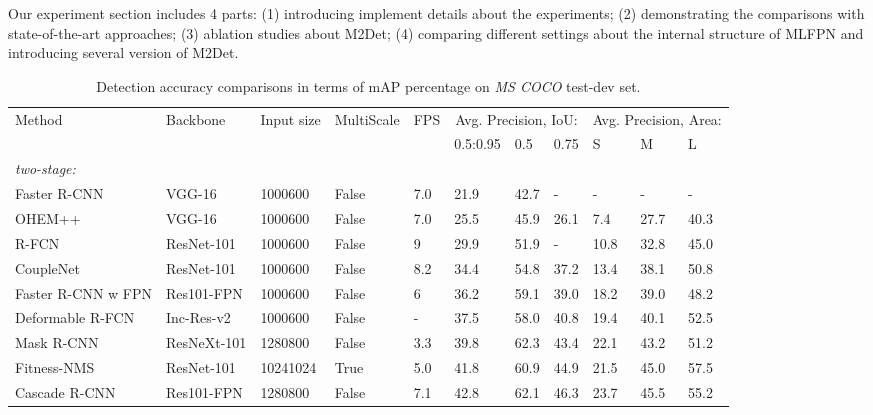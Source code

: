 \documentclass[letterpaper]{article} \usepackage{aaai18}  \usepackage{times}  \usepackage{helvet}  \usepackage{courier}  \usepackage{url}  \usepackage{graphicx}
\begin{document}
Our experiment section includes 4 parts: (1) introducing implement details about the experiments; (2) demonstrating the comparisons with state-of-the-art approaches; (3) ablation studies about M2Det; (4) comparing different settings about the internal structure of MLFPN and introducing several version of M2Det.

\begin{table*}[!t]
\centering
 \scriptsize
	\caption{Detection accuracy comparisons in terms of mAP percentage on \textit{MS COCO} test-dev set.}
	\label{tab:cocoresults}
	\centering
	\begin{tabular}{|p{5cm}<{\raggedright}|p{1.4cm}<{\raggedright}|p{1.3cm}<{\centering}|p{1.0cm}<{\centering}|p{0.8cm}<{\centering}|p{0.6cm}<{\centering}p{0.6cm}<{\centering}p{0.6cm}<{\centering}|p{0.6cm}<{\centering}p{0.6cm}<{\centering}p{0.6cm}<{\centering}|}
		\hline
\multirow{2}{*}{Method} & \multirow{2}{*}{Backbone} & \multirow{2}{*}{Input size} &  \multirow{2}{*}{MultiScale} & \multirow{2}{*}{FPS} &\multicolumn{3}{c|}{Avg. Precision, IoU:} & \multicolumn{3}{c|}{Avg. Precision, Area:}  \\
		& & & & & 0.5:0.95 & 0.5 & 0.75 & S & M & L \\
		\hline
		\small\textit{two-stage:} & & & & & & & & & &\quad \\
		Faster R-CNN \cite{RenHGS15}   & VGG-16 & 1000600&False&7.0& 21.9 & 42.7 & - & - & - & - \\
		OHEM++ \cite{ShrivastavaGG16}  & VGG-16 & 1000600&False&7.0& 25.5 & 45.9 & 26.1 & 7.4 & 27.7 & 40.3 \\
		R-FCN \cite{DaiLHS16} & ResNet-101 & 1000600&False&9& 29.9 & 51.9 & - & 10.8 & 32.8 & 45.0 \\
		CoupleNet \cite{ZhuZWZWL17}  & ResNet-101 & 1000600&False&8.2& 34.4 & 54.8 & 37.2 & 13.4 & 38.1 & 50.8 \\
Faster R-CNN w FPN \cite{LinDGHHB17}  & Res101-FPN & 1000600&False&6& 36.2 & 59.1 & 39.0 & 18.2 & 39.0 & 48.2 \\
		Deformable R-FCN \cite{DaiQXLZHW17}  & Inc-Res-v2 & 1000600&False&-& 37.5 & 58.0 & 40.8 & 19.4 & 40.1 & 52.5 \\
		Mask R-CNN \cite{HeGDG17} &ResNeXt-101 &1280800 & False &3.3& 39.8 & 62.3 & 43.4 & 22.1 & 43.2& 51.2\\
		Fitness-NMS \cite{abs-1711-00164} &ResNet-101 & 10241024 &True & 5.0 & 41.8&60.9 &44.9& 21.5&45.0&57.5\\
		Cascade R-CNN \cite{abs-1712-00726} &Res101-FPN &1280800&False&7.1& 42.8 &62.1&46.3&23.7&45.5&55.2\\

\end{tabular}
\end{table*}
\end{document}
